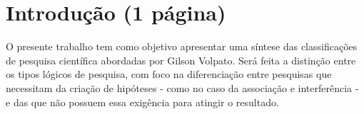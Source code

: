 \section{\esp Introdução (1 página)} 

O presente trabalho tem como objetivo apresentar uma síntese das classificações de pesquisa científica abordadas por Gilson Volpato\cite{volpato2012}. Será feita a distinção entre os tipos lógicos de pesquisa, com foco na diferenciação entre pesquisas que necessitam da criação de hipóteses - como no caso da associação e interferência - e das que não possuem essa exigência para atingir o resultado.


